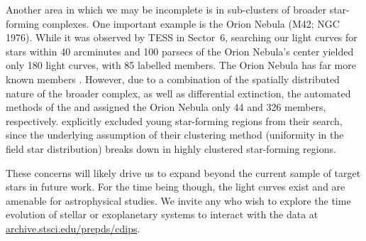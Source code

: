 \documentclass[12pt,twocolumn,tighten]{aastex62}
\newcommand{\stscilink}{\url{archive.stsci.edu/prepds/cdips}}
\begin{document}
Another area in which we may be incomplete is in sub-clusters
of broader star-forming complexes. One important example is
the Orion Nebula (M42; NGC 1976).  While it was observed by TESS in
Sector~6, searching our light curves for stars within 40 arcminutes
and 100 parsecs of the Orion Nebula's center yielded only 180 light
curves, with 85 labelled members.  The Orion Nebula has far more known
members \citep{jones_proper_1988}.  However, due to a combination of
the spatially distributed nature of the broader complex, as well as
differential extinction, the automated methods of the
\citet{Kharchenko_et_al_2013} and \citet{dias_proper_2014} assigned
the Orion Nebula only 44 and 326 members, respectively.
\citet{cantat-gaudin_gaia_2018} explicitly excluded young star-forming
regions from their search, since the underlying assumption of their
clustering method (uniformity in the field star distribution) breaks
down in highly clustered star-forming regions.

These concerns will likely drive us to expand beyond the current
sample of target stars in future work.  For the time being though, 
the light curves exist and are amenable for astrophysical studies.  We
invite any who wish to explore the time evolution of stellar or
exoplanetary systems to interact with the data at \stscilink.
\end{document}
